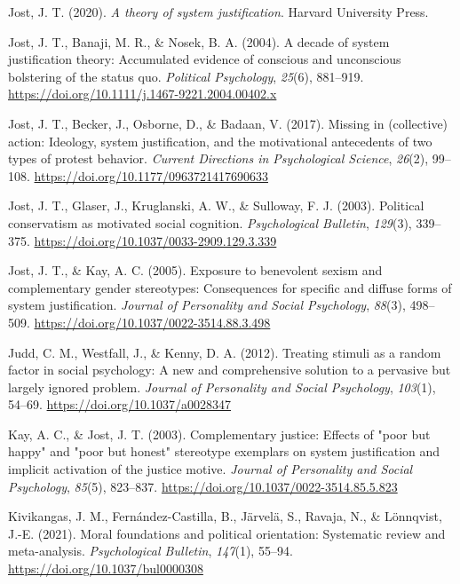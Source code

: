 \documentclass[twocolumn, 11pt, letterpaper]{article}
\newenvironment{CSLReferences}[2]{}{}
\begin{document}
\begin{CSLReferences}{1}{0}
\leavevmode{}%
Jost, J. T. (2020). \emph{A theory of system justification}. Harvard
University Press.

\leavevmode{}%
Jost, J. T., Banaji, M. R., \& Nosek, B. A. (2004). A decade of system
justification theory: Accumulated evidence of conscious and unconscious
bolstering of the status quo. \emph{Political Psychology}, \emph{25}(6),
881--919. \url{https://doi.org/10.1111/j.1467-9221.2004.00402.x}

\leavevmode{}%
Jost, J. T., Becker, J., Osborne, D., \& Badaan, V. (2017). Missing in
(collective) action: Ideology, system justification, and the
motivational antecedents of two types of protest behavior. \emph{Current
Directions in Psychological Science}, \emph{26}(2), 99--108.
\url{https://doi.org/10.1177/0963721417690633}

\leavevmode{}%
Jost, J. T., Glaser, J., Kruglanski, A. W., \& Sulloway, F. J. (2003).
Political conservatism as motivated social cognition.
\emph{Psychological Bulletin}, \emph{129}(3), 339--375.
\url{https://doi.org/10.1037/0033-2909.129.3.339}

\leavevmode{}%
Jost, J. T., \& Kay, A. C. (2005). Exposure to benevolent sexism and
complementary gender stereotypes: Consequences for specific and diffuse
forms of system justification. \emph{Journal of Personality and Social
Psychology}, \emph{88}(3), 498--509.
\url{https://doi.org/10.1037/0022-3514.88.3.498}

\leavevmode{}%
Judd, C. M., Westfall, J., \& Kenny, D. A. (2012). Treating stimuli as a
random factor in social psychology: {A} new and comprehensive solution
to a pervasive but largely ignored problem. \emph{Journal of Personality
and Social Psychology}, \emph{103}(1), 54--69.
\url{https://doi.org/10.1037/a0028347}

\leavevmode{}%
Kay, A. C., \& Jost, J. T. (2003). Complementary justice: Effects of
"poor but happy" and "poor but honest" stereotype exemplars on system
justification and implicit activation of the justice motive.
\emph{Journal of Personality and Social Psychology}, \emph{85}(5),
823--837. \url{https://doi.org/10.1037/0022-3514.85.5.823}

\leavevmode{}%
Kivikangas, J. M., Fernández-Castilla, B., Järvelä, S., Ravaja, N., \&
Lönnqvist, J.-E. (2021). Moral foundations and political orientation:
{Systematic} review and meta-analysis. \emph{Psychological Bulletin},
\emph{147}(1), 55--94. \url{https://doi.org/10.1037/bul0000308}


\end{CSLReferences}
\end{document}
